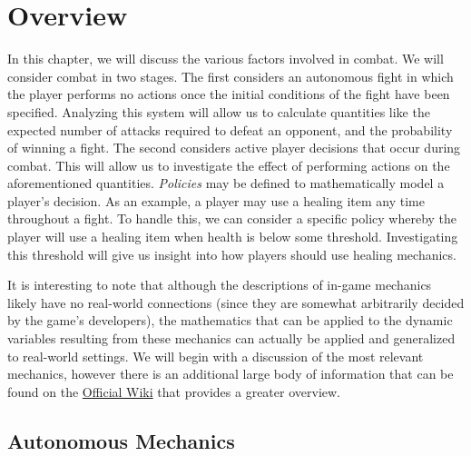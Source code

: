\chapter{Overview}
In this chapter, we will discuss the various factors involved in combat. We will consider combat in two stages. The first considers an autonomous fight in which the player performs no actions once the initial conditions of the fight have been specified. Analyzing this system will allow us to calculate quantities like the expected number of attacks required to defeat an opponent, and the probability of winning a fight. The second considers active player decisions that occur during combat. This will allow us to investigate the effect of performing actions on the aforementioned quantities. \textit{Policies} may be defined to mathematically model a player's decision. As an example, a player may use a healing item any time throughout a fight. To handle this, we can consider a specific policy whereby the player will use a healing item when health is below some threshold. Investigating this threshold will give us insight into how players should use healing mechanics.

It is interesting to note that although the descriptions of in-game mechanics likely have no real-world connections (since they are somewhat arbitrarily decided by the game's developers), the mathematics that can be applied to the dynamic variables resulting from these mechanics can actually be applied and generalized to real-world settings. We will begin with a discussion of the most relevant mechanics, however there is an additional large body of information that can be found on the \href{https://oldschool.runescape.wiki/w/Combat}{Official Wiki} that provides a greater overview.


\section{Autonomous Mechanics}
